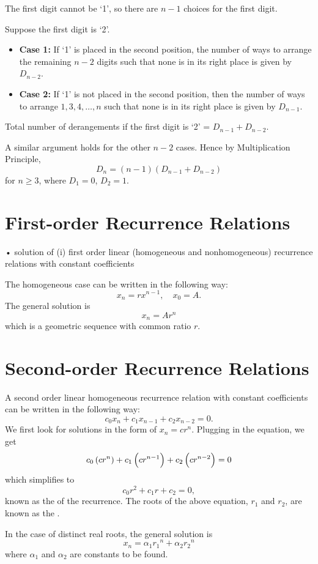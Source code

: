 \begin{solution}
The first digit cannot be `1', so there are $n-1$ choices for the first digit.

Suppose the first digit is `2'.
\begin{itemize}
\item \textbf{Case 1:} If `1' is placed in the second position, the number of ways to arrange the remaining $n-2$ digits such that none is in its right place is given by $D_{n-2}$.
\item \textbf{Case 2:} If `1' is not placed in the second position, then the number of ways to arrange $1,3,4,\dots,n$ such that none is in its right place is given by $D_{n-1}$.
\end{itemize}
Total number of derangements if the first digit is `2' = $D_{n-1}+D_{n-2}$.

A similar argument holds for the other $n-2$ cases. Hence by Multiplication Principle,
\[ D_n=(n-1)(D_{n-1}+D_{n-2}) \]
for $n\ge3$, where $D_1=0$, $D_2=1$.
\end{solution}
\pagebreak

\section{First-order Recurrence Relations}
• solution of
(i) first order linear (homogeneous and nonhomogeneous) recurrence relations with constant coefficients

The homogeneous case can be written in the following way:
\[ x_n=rx^{n-1}, \quad x_0=A. \] 
The general solution is
\[ \boxed{x_n=Ar^n} \]
which is a geometric sequence with common ratio $r$.

\section{Second-order Recurrence Relations}
A second order linear homogeneous recurrence relation with constant coefficients can be written in the following way:
\[ c_0x_n+c_1x_{n-1}+c_2x_{n-2}=0. \]
We first look for solutions in the form of $x_n=cr^n$. Plugging in the equation, we get
\[ c_0\left(cr^n\right)+c_1\left(cr^{n-1}\right)+c_2\left(cr^{n-2}\right)=0 \] 
which simplifies to
\[ c_0r^2+c_1r+c_2=0, \] 
known as the  of the recurrence. The roots of the above equation, $r_1$ and $r_2$, are known as the .

In the case of distinct real roots, the general solution is 
\[ \boxed{x_n=\alpha_1{r_1}^n+\alpha_2{r_2}^n} \]
where $\alpha_1$ and $\alpha_2$ are constants to be found.

